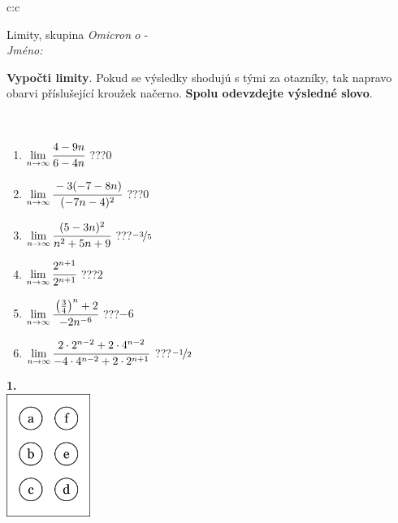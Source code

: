 \documentclass[10pt]{report}
\newcommand\omicron{o}
\begin{document}
\begin{tabular}{c:c}
\begin{minipage}[c][104.5mm][t]{0.5\linewidth}
\begin{center}
\vspace{7mm}
{\huge Limity, skupina \textit{Omicron $\omicron$} -}\\[5mm]
\textit{Jméno:}\phantom{xxxxxxxxxxxxxxxxxxxxxxxxxxxxxxxxxxxxxxxxxxxxxxxxxxxxxxxxxxxxxxxxx}\\[5mm]
\begin{minipage}{0.95\linewidth}
\begin{center}
\textbf{Vypočti limity}. Pokud se výsledky shodujú s tými za otazníky, tak napravo\\obarvi příslušející kroužek načerno. \textbf{Spolu odevzdejte výsledné slovo}.
\end{center}
\end{minipage}
\\[1mm]
\begin{minipage}{0.79\linewidth}
\begin{center}
\begin{varwidth}{\linewidth}
\begin{enumerate}
\normalsize
\item $\lim\limits_{n\to\infty}\cfrac{4-9n}{6-4n}$\quad \dotfill\; ???\;\dotfill \quad $0$
\item $\lim\limits_{n\to\infty}\cfrac{-3(-7-8n)}{(-7n-4)^2}$\quad \dotfill\; ???\;\dotfill \quad $0$
\item $\lim\limits_{n\to\infty}\cfrac{(5-3n)^2}{n^2+5n+9}$\quad \dotfill\; ???\;\dotfill \quad $\nicefrac{-3}{5}$
\item $\lim\limits_{n\to\infty}\cfrac{2^{n+1}}{2^{n+1}}$\quad \dotfill\; ???\;\dotfill \quad $2$
\item $\lim\limits_{n\to\infty}\cfrac{\left(\frac{3}{4}\right)^n +2}{-2n^{-6}}$\quad \dotfill\; ???\;\dotfill \quad $-6$
\item $\lim\limits_{n\to\infty}\cfrac{2\cdot 2^{n-2}+2\cdot 4^{n-2}}{-4\cdot 4^{n-2}+2\cdot 2^{n+1}}$\quad \dotfill\; ???\;\dotfill \quad $\nicefrac{-1}{2}$
\end{enumerate}
\end{varwidth}
\end{center}
\end{minipage}
\begin{minipage}{0.20\linewidth}
\begin{center}
{\Huge\bfseries 1.} \\[2mm]
\includegraphics[height=40mm]{../images/braille.png}

\end{center}
\end{minipage}
\end{center}
\end{minipage}
\end{tabular}
\end{document}
